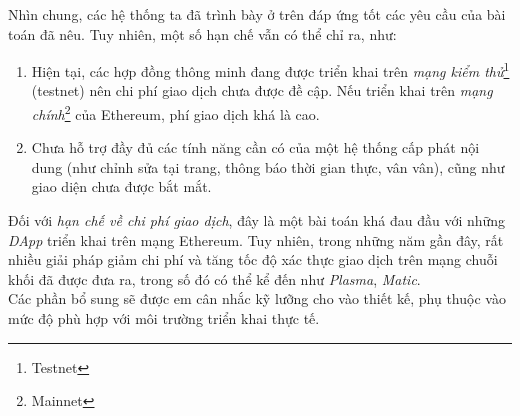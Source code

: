 Nhìn chung, các hệ thống ta đã trình bày ở trên đáp ứng tốt các yêu cầu của bài toán đã nêu. Tuy nhiên, một số hạn chế vẫn có thể chỉ ra, như:
\begin{enumerate}
    \item Hiện tại, các hợp đồng thông minh đang được triển khai trên \textit{mạng kiểm thử}\footnote{Testnet} (testnet) nên chi phí giao dịch chưa được đề cập. Nếu triển khai trên \textit{mạng chính}\footnote{Mainnet} của Ethereum, phí giao dịch khá là cao.\label{cons/transaction-fee}
    \item Chưa hỗ trợ đầy đủ các tính năng cần có của một hệ thống cấp phát nội dung (như chỉnh sửa tại trang, thông báo thời gian thực, vân vân), cũng như giao diện chưa được bắt mắt.
\end{enumerate}

Đối với \textit{hạn chế về chi phí giao dịch}, đây là một bài toán khá đau đầu với những \textit{DApp} triển khai trên mạng Ethereum. Tuy nhiên, trong những năm gần đây, rất nhiều giải pháp giảm chi phí và tăng tốc độ xác thực giao dịch trên mạng chuỗi khối đã được đưa ra, trong số đó có thể kể đến như \textit{Plasma}, \textit{Matic}.\\

Các phần bổ sung sẽ được em cân nhắc kỹ lưỡng cho vào thiết kế, phụ thuộc vào mức độ phù hợp với môi trường triển khai thực tế.